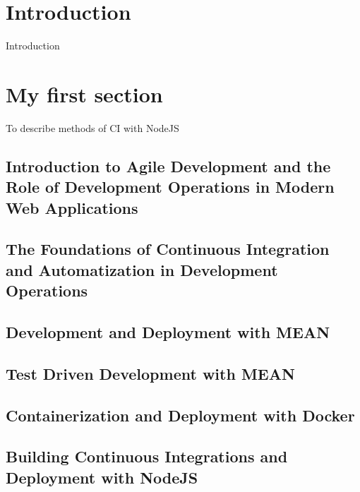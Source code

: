 \section{Introduction}
Introduction

\newpage

\section{My first section}
\label{section:Introduction}
To describe methods of CI with NodeJS

\subsection{Introduction to Agile Development and the Role of Development Operations in Modern Web Applications}


\subsection{The Foundations of Continuous Integration and Automatization in Development Operations}
\subsection{Development and Deployment with MEAN}
\subsection{Test Driven Development with MEAN}
\subsection{Containerization and Deployment with Docker}
\subsection{Building Continuous Integrations and Deployment with NodeJS}


%
%
%
%
%
%
